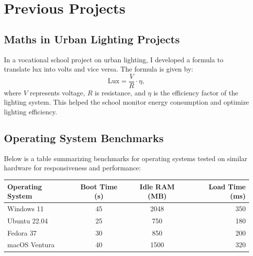 \documentclass[12pt,a4paper]{article}
\begin{document}
\section*{Previous Projects}

\subsection*{Maths in Urban Lighting Projects}
In a vocational school project on urban lighting, I developed a formula to translate lux into volts and vice versa. The formula is given by:
\begin{equation}
    \text{Lux} = \frac{V}{R} \cdot \eta,
\end{equation}
where \(V\) represents voltage, \(R\) is resistance, and \(\eta\) is the efficiency factor of the lighting system. This helped the school monitor energy consumption and optimize lighting efficiency.

\subsection*{Operating System Benchmarks}
Below is a table summarizing benchmarks for operating systems tested on similar hardware for responsiveness and performance:

\begin{longtable}{|l|c|c|r|}
    \hline
    \textbf{Operating System} & \textbf{Boot Time (s)} & \textbf{Idle RAM (MB)} & \textbf{Load Time (ms)} \\ \hline
    Windows 11               & 45                   & 2048                   & 350                     \\ \hline
    Ubuntu 22.04             & 25                   & 750                    & 180                     \\ \hline
    Fedora 37                & 30                   & 850                    & 200                     \\ \hline
    macOS Ventura            & 40                   & 1500                   & 320                     \\ \hline
\end{longtable}
\end{document}
